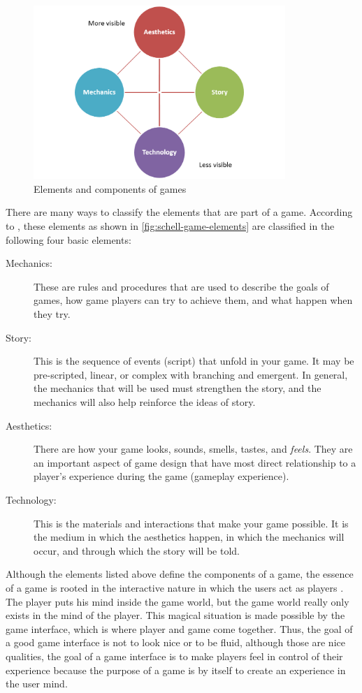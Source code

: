 \begin{figure}[htb]
 \caption{Elements and components of games}
 \label{fig:schell-game-elements}
 \centering
 \includegraphics[width=0.85\textwidth]{images/chap-general-background/schell-game-elements.png}
\end{figure}

There are many ways to classify the elements that are part of a game. According to , these elements as shown in \autoref{fig:schell-game-elements} are classified in the following four basic elements:

\begin{description}
\item[Mechanics:] These are rules and procedures that are used to describe the goals of games, how game players can try to achieve them, and what happen when they try.
\item[Story:] This is the sequence of events (script) that unfold in your game. It may be pre-scripted, linear, or complex with branching and emergent. In general, the mechanics that will be used must strengthen the story, and the mechanics will also help reinforce the ideas of story.
\item[Aesthetics:] There are how your game looks, sounds, smells, tastes, and \emph{feels}. They are an important aspect of game design that have most direct relationship to a player's experience during the game (gameplay experience).
\item[Technology:] This is the materials and interactions that make your game possible. It is the medium in which the aesthetics happen, in which the mechanics will occur, and through which the story will be told. 
\end{description}


Although the elements listed above define the components of a game, the essence of a game is rooted in the interactive nature in which the users act as players \cite{Schell2008}.
The player puts his mind inside the game world, but the game world really only exists in the mind of the player.
This magical situation is made possible by the game interface, which is where player and game come together.
Thus, the goal of a good game interface is not to look nice or to be fluid, although those are nice qualities, the goal of a game interface is to make players feel in control of their experience because the purpose of a game is by itself to create an experience in the user mind.

